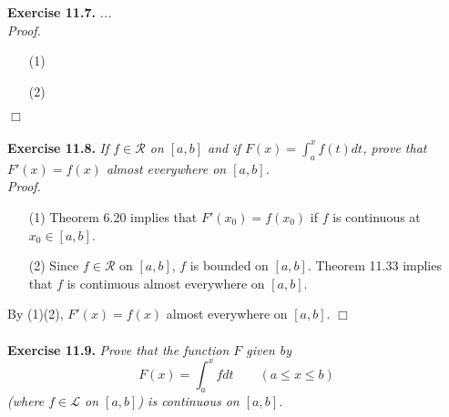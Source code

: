 \documentclass{article}
\begin{document}



\textbf{Exercise 11.7.}
\emph{...} \\

\emph{Proof.}
\begin{enumerate}
\item[(1)]
\item[(2)]

\end{enumerate}
$\Box$ \\\\






\textbf{Exercise 11.8.}
\emph{If $f \in \mathscr{R}$ on $[a,b]$ and if $F(x) = \int_{a}^{x}f(t)dt$,
prove that $F'(x) = f(x)$ almost everywhere on $[a,b]$.} \\

\emph{Proof.}
\begin{enumerate}
\item[(1)]
  Theorem 6.20 implies that
  $F'(x_0) = f(x_0)$ if $f$ is continuous at $x_0 \in [a,b]$.

\item[(2)]
  Since $f \in \mathscr{R}$ on $[a,b]$, $f$ is bounded on $[a,b]$.
  Theorem 11.33 implies that
  $f$ is continuous almost everywhere on $[a,b]$.
\end{enumerate}
By (1)(2), $F'(x) = f(x)$ almost everywhere on $[a,b]$.
$\Box$ \\\\






\textbf{Exercise 11.9.}
\emph{Prove that the function $F$ given by
\[
  F(x) = \int_{a}^{x} f dt
  \qquad
  (a \leq x \leq b)
\]
(where $f \in \mathscr{L}$ on $[a,b]$) is continuous on $[a,b]$.} \\
\end{document}
